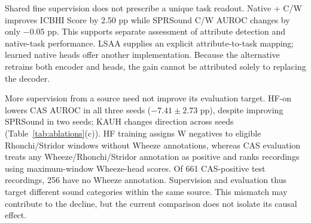 \LSAAAnalysisTable

Shared fine supervision does not prescribe a unique task readout.
Native + C/W improves ICBHI Score by 2.50 pp while SPRSound C/W AUROC
changes by only $-0.05$ pp. This supports separate assessment of attribute
detection and native-task performance. LSAA supplies an explicit
attribute-to-task mapping; learned native heads offer another implementation.
Because the alternative retrains both encoder and heads, the gain cannot
be attributed solely to replacing the decoder.

\label{sec:hf_supervision}
More supervision from a source need not improve its evaluation target.
HF-on lowers CAS AUROC in all three seeds ($-7.41\pm2.73$ pp), despite
improving SPRSound in two seeds; KAUH changes direction across seeds
(Table~\ref{tab:ablations}(c)). HF training assigns W negatives to eligible
Rhonchi/Stridor windows without Wheeze annotations, whereas CAS evaluation
treats any Wheeze/Rhonchi/Stridor annotation as positive and ranks recordings
using maximum-window Wheeze-head scores. Of 661 CAS-positive test recordings,
256 have no Wheeze annotation. Supervision and evaluation thus target
different sound categories within the same source. This mismatch may contribute
to the decline, but the current comparison does not isolate its causal effect.
\par
\endgroup
